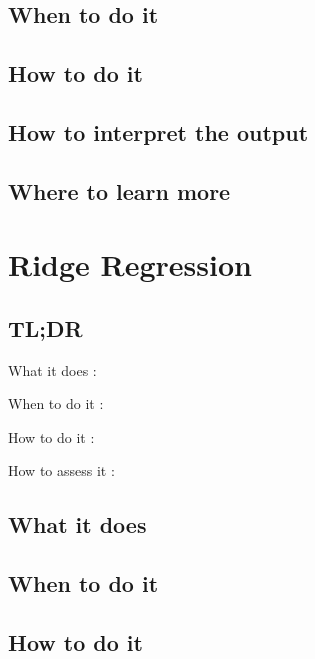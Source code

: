 \documentclass[
]{book}
\begin{document}
\hypertarget{when-to-do-it-12}{%
\section{When to do it}\label{when-to-do-it-12}}

\hypertarget{how-to-do-it-12}{%
\section{How to do it}\label{how-to-do-it-12}}

\hypertarget{how-to-interpret-the-output-12}{%
\section{How to interpret the output}\label{how-to-interpret-the-output-12}}

\hypertarget{where-to-learn-more-12}{%
\section{Where to learn more}\label{where-to-learn-more-12}}

\hypertarget{ridge-regression}{%
\chapter{Ridge Regression}\label{ridge-regression}}

\hypertarget{tldr-13}{%
\section{TL;DR}\label{tldr-13}}

What it does
:

When to do it
:

How to do it
:

How to assess it
:

\hypertarget{what-it-does-13}{%
\section{What it does}\label{what-it-does-13}}

\hypertarget{when-to-do-it-13}{%
\section{When to do it}\label{when-to-do-it-13}}

\hypertarget{how-to-do-it-13}{%
\section{How to do it}\label{how-to-do-it-13}}
\end{document}
